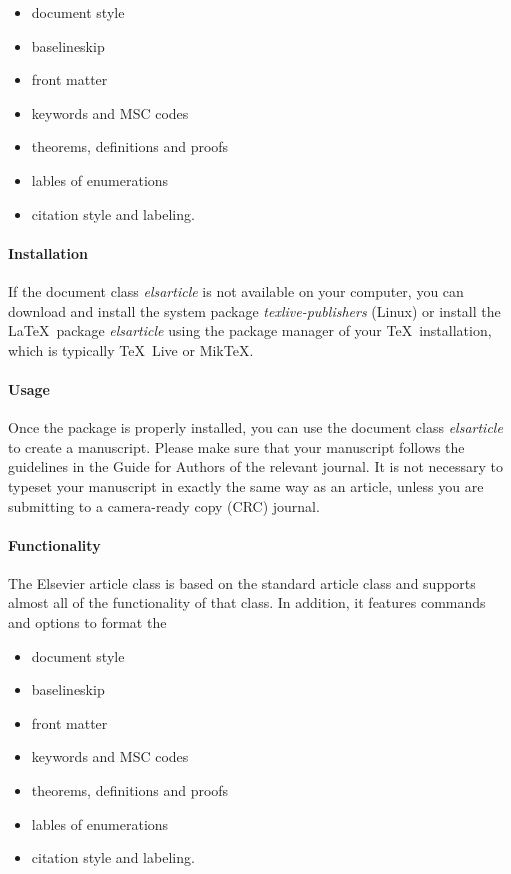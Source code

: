 \documentclass[review]{elsarticle}
\begin{document}
\begin{itemize}
\item document style
\item baselineskip
\item front matter
\item keywords and MSC codes
\item theorems, definitions and proofs
\item lables of enumerations
\item citation style and labeling.
\end{itemize}

\paragraph{Installation} If the document class \emph{elsarticle} is not available on your computer, you can download and install the system package \emph{texlive-publishers} (Linux) or install the \LaTeX\ package \emph{elsarticle} using the package manager of your \TeX\ installation, which is typically \TeX\ Live or Mik\TeX.

\paragraph{Usage} Once the package is properly installed, you can use the document class \emph{elsarticle} to create a manuscript. Please make sure that your manuscript follows the guidelines in the Guide for Authors of the relevant journal. It is not necessary to typeset your manuscript in exactly the same way as an article, unless you are submitting to a camera-ready copy (CRC) journal.

\paragraph{Functionality} The Elsevier article class is based on the standard article class and supports almost all of the functionality of that class. In addition, it features commands and options to format the
\begin{itemize}
\item document style
\item baselineskip
\item front matter
\item keywords and MSC codes
\item theorems, definitions and proofs
\item lables of enumerations
\item citation style and labeling.
\end{itemize}
\end{document}
